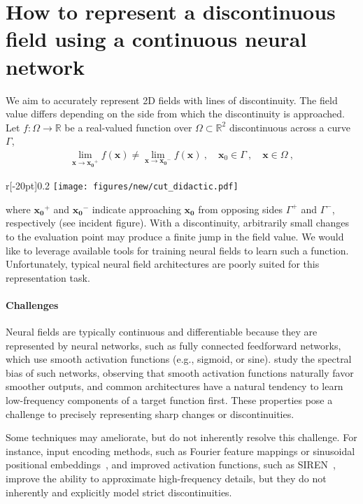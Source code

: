 \section{How to represent a discontinuous field using a continuous neural network}
\label{sec:lifting}

We aim to accurately represent 2D fields with lines of discontinuity. The field value differs depending on the side from which the discontinuity is approached. Let $f : \Omega \rightarrow \mathbb{R}$ be a real-valued function over $\Omega \subset \mathbb{R}^2$ discontinuous across a curve $\Gamma$, 
\begin{align}
\lim_{\mathbf{x} \to \bm{x_0}^+} f(\mathbf{x}) \neq \lim_{\mathbf{x} \to \bm{x_0}^-} f(\mathbf{x}) \ , \quad \bm{x}_0 \in \Gamma \ , \quad \bm{x} \in \Omega \ ,
\end{align}
\begin{wrapfigure}[6]{r}[-20pt]{0.2\linewidth}
\vspace{-2ex}
\texttt{[image: figures/new/cut\_didactic.pdf]}
\end{wrapfigure}
where $\bm{x_0}^+$ and $\bm{x_0}^-$ indicate approaching $\bm{x_0}$ from opposing sides 
$\Gamma^+$ and $\Gamma^-$, respectively (see incident figure).
With a discontinuity, arbitrarily small changes to the evaluation point may produce a finite jump in the field value. We would like to leverage available tools for training neural fields to learn such a function. Unfortunately, typical neural field architectures are poorly suited for this representation task.

\paragraph{Challenges}
Neural fields are typically continuous and differentiable because they are represented by neural networks, such as fully connected feedforward networks, which use smooth activation functions (e.g., sigmoid, or sine). \citet{Rahaman:2019:Spectral} study the spectral bias of such networks, observing that smooth activation functions naturally favor smoother outputs, and common architectures have a natural tendency to learn low-frequency components of a target function first. These properties pose a challenge to precisely representing sharp changes or discontinuities. 

Some techniques may ameliorate, but do not inherently resolve this challenge. For instance, input encoding methods, such as Fourier feature mappings or sinusoidal positional embeddings~\cite{Tancik:2020:Fourier}, and improved activation functions, such as SIREN~\cite{Sitzmann:2020:Implicit}, improve the ability to approximate high-frequency details, but they do not inherently and explicitly model strict discontinuities. 

